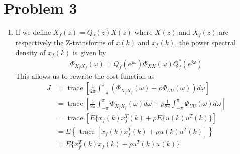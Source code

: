 \section*{Problem 3}

\begin{enumerate}
    \item
    If we define $X_f(z) = Q_f(z) X(z)$ where $X(z)$ and $X_f(z)$ are respectively the Z-transforms of $x(k)$ and $x_f(k)$, the power spectral density of $x_f(k)$ is given by
    \begin{align*}
        \Phi_{X_f X_f}(\omega) = Q_f(e^{j\omega}) \Phi_{XX}(\omega) Q_f^*(e^{j\omega})
    \end{align*}
    This allows us to rewrite the cost function as
    \begin{align*}
        J & = \operatorname{trace} \left[ \frac{1}{2\pi} \int_{-\pi}^\pi 
            \left( \Phi_{X_f X_f}(\omega) + \rho \Phi_{UU}(\omega) \right) d\omega \right] \\
        & = \operatorname{trace} \left[ \frac{1}{2\pi} \int_{-\pi}^\pi \Phi_{X_f X_f}(\omega) d\omega 
            + \rho \frac{1}{2\pi} \int_{-\pi}^\pi \Phi_{UU}(\omega) d\omega \right] \\
        & = \operatorname{trace} \left[ E\{x_f(k) x_f^T(k) + \rho E \{ u(k) u^T(k) \} \right] \\
        & = E \left\{ \operatorname{trace} [ x_f(k) x_f^T(k) + \rho u(k) u^T(k)] \right\} \\
        & = E \{ x_f^T(k) x_f(k) + \rho u^T(k) u(k) \}
    \end{align*}
    

\end{enumerate}
